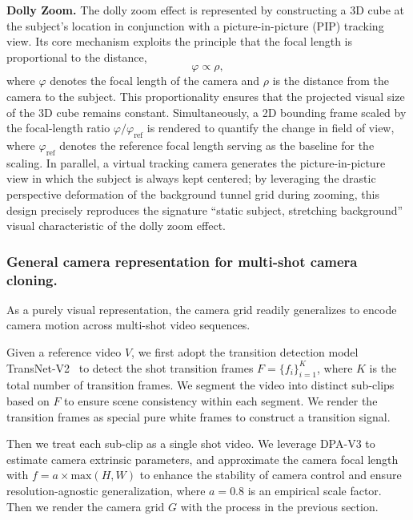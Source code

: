 \documentclass{llmxive}
\begin{document}
\textbf{Dolly Zoom.}
The dolly zoom effect is represented by constructing a 3D cube at the subject's location in conjunction with a picture-in-picture (PIP) tracking view. Its core mechanism exploits the principle that the focal length is proportional to the distance,
\begin{equation}
    \varphi \propto \rho,
\end{equation}
where $\varphi$ denotes the focal length of the camera and $\rho$ is the distance from the camera to the subject. This proportionality ensures that the projected visual size of the 3D cube remains constant. Simultaneously, a 2D bounding frame scaled by the focal-length ratio $\varphi / \varphi_{\mathrm{ref}}$ is rendered to quantify the change in field of view, where $\varphi_{\mathrm{ref}}$ denotes the reference focal length serving as the baseline for the scaling. In parallel, a virtual 
tracking camera generates the picture-in-picture view in which the 
subject is always kept centered; by leveraging the drastic perspective deformation of the background tunnel grid during zooming, this design precisely reproduces the signature ``static subject, stretching background'' visual characteristic of the dolly zoom effect.


\subsubsection{General camera representation for multi-shot camera cloning.}
As a purely visual representation, the camera grid readily generalizes to encode camera motion across multi-shot video sequences.

Given a reference video $V$, we first adopt the transition detection model TransNet-V2~\cite{soucek2024transnetv2} to detect the shot transition frames $F=\{f_i\}_{i=1}^{K}$, where $K$ is the total number of transition frames. We segment the video into distinct sub-clips based on $F$ to ensure scene consistency within each segment. We render the transition frames as special pure white frames to construct a transition signal. 

Then we treat each sub-clip as a single shot video. We leverage DPA-V3 \cite{lin2025dpa3} to estimate camera extrinsic parameters, and approximate the camera focal length with $f=a\times \text{max}(H, W)$ to enhance the stability of camera control and ensure resolution-agnostic generalization, where $a=0.8$ is an empirical scale factor. Then we render the camera grid $G$ with the process in the previous section.
\end{document}
